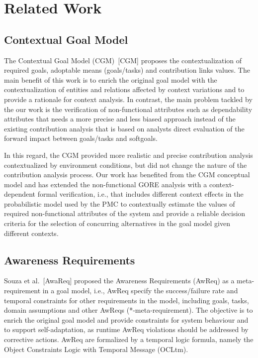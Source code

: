 \chapter{Related Work}\label{ch:related_work}

\section{Contextual Goal Model}

The Contextual Goal Model (CGM)~[CGM] proposes the contextualization of required goals, adoptable means (goals/tasks) and contribution links values. The main benefit of this work is to enrich the original goal model with the contextualization of entities and relations affected by context variations and to provide a rationale for context analysis. In contrast, the main problem tackled by the our work is the verification of non-functional attributes such as dependability attributes that needs a more precise and less biased approach instead of the existing contribution analysis that is based on analysts direct evaluation of the forward impact between goals/tasks and softgoals. 

In this regard, the CGM provided more realistic and precise contribution analysis contextualized by environment conditions, but did not change the nature of the contribution analysis process. Our work has benefited from the CGM conceptual model and has extended the non-functional GORE analysis with a context-dependent formal verification, i.e., that includes different context effects in the probabilistic model used by the PMC to contextually estimate the values of required non-functional attributes of the system and provide a reliable decision criteria for the selection of concurring alternatives in the goal model given different contexts.

\section{Awareness Requirements}

Souza et al.~[AwaReq] proposed the Awareness Requirements (AwReq) as a meta-requirement in a goal model, i.e., AwReq specify the success/failure rate and temporal constraints for other requirements in the model, including goals, tasks, domain assumptions and other AwReqs (*-meta-requirement). The objective is to enrich the original goal model and provide constraints for system behaviour and to support self-adaptation, as runtime AwReq violations should be addressed by corrective actions. AwReq are formalized by a temporal logic formula, namely the Object Constraints Logic with Temporal Message (OCLtm).

